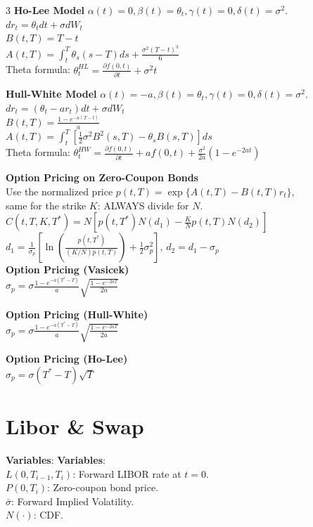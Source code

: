 \documentclass[8pt, a4paper, landscape]{extarticle}
\newcommand{\df}[2]{\frac{\partial #1}{\partial #2}}
\begin{document}
\begin{multicols*}{3}
\textbf{Ho-Lee Model}
$\alpha(t)=0, \beta(t)=\theta_t, \gamma(t)=0, \delta(t)=\sigma^2$.\\
$dr_t = \theta_t dt + \sigma dW_t$ \\
$B(t, T) = T-t$ \\
$A(t, T) = \int_t^T \theta_s (s-T) ds + \frac{\sigma^2 (T-t)^3}{6}$ \\
Theta formula: $\theta^{HL}_t = \df{f(0,t)}{t} + \sigma^2 t$

\textbf{Hull-White Model}
$\alpha(t)=-a, \beta(t)=\theta_t, \gamma(t)=0, \delta(t)=\sigma^2$.\\
$dr_t = (\theta_t - ar_t)dt + \sigma dW_t$ \\
$B(t, T) = \frac{1 - e^{-a(T-t)}}{a}$ \\
$A(t, T) = \int_t^T [\frac{1}{2}\sigma^2 B^2(s, T) - \theta_s B(s, T) ] ds$ \\
Theta formula: $\theta^{HW}_t = \df{f(0,t)}{t} + a f(0, t) + \frac{\sigma^2}{2a}(1-e^{-2at})$

\textbf{Option Pricing on Zero-Coupon Bonds} \\
Use the normalized price $p(t, T) = \exp\{A(t, T) - B(t, T)r_t\}$,\\
same for the strike $K$: ALWAYS divide for $N$.\\
$C(t, T, K, T^*) = N\left[p(t, T^*)N(d_1) - \frac{K}{N} p(t, T)N(d_2)\right]$ \\
$d_1 = \frac{1}{\sigma_p} \left[\ln\left(\frac{p(t, T^*)}{(K/N) p(t, T)}\right) + \frac{1}{2}\sigma_p^2\right]$, \quad $d_2 = d_1 - \sigma_p$ \\

\textbf{Option Pricing (Vasicek)} \\
$\sigma_p = \sigma \frac{1-e^{-a(T^*-T)}}{a} \sqrt{\frac{1-e^{-2aT}}{2a}}$

\textbf{Option Pricing (Hull-White)} \\
$\sigma_p = \sigma \frac{1-e^{-a(T^*-T)}}{a} \sqrt{\frac{1-e^{-2aT}}{2a}}$

\textbf{Option Pricing (Ho-Lee)} \\
$\sigma_p = \sigma (T^* - T) \sqrt{T}$

\section*{Libor \& Swap}
\textbf{Variables}:
\textbf{Variables}: \\
$L(0, T_{i-1}, T_i)$: Forward LIBOR rate at $t=0$. \\
$P(0, T_i)$: Zero-coupon bond price. \\
$\bar{\sigma}$: Forward Implied Volatility. \\
$N(\cdot)$: CDF.


\end{multicols*}
\end{document}
